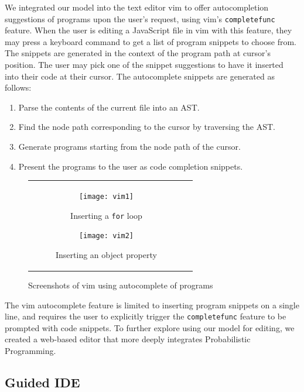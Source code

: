 \documentclass[titlepage]{article}
\begin{document}
We integrated our model into the text editor vim to offer autocompletion
suggestions of programs upon the user's request, using vim's
\texttt{completefunc} feature. When the user is editing a JavaScript file in vim with
this feature, they may press a keyboard command to get a list of program
snippets to choose from. The snippets are generated in the context of the
program path at cursor's position. The user may pick one of the snippet
suggestions to have it inserted into their code at their cursor. The autocomplete snippets are generated as follows:
\begin{enumerate}
	\item Parse the contents of the current file into an AST.
	\item Find the node path corresponding to the cursor by traversing the AST.
	\item Generate programs starting from the node path of the cursor.
	\item Present the programs to the user as code completion snippets.
\end{enumerate}

\begin{figure}[ht]
	\centering
	\begin{tabular}{c c}
		\begin{subfigure}[h]{6.25cm}
			\centering
			\texttt{[image: vim1]}
			\caption{Inserting a {\tt for} loop} \label{fig:vim1}
		\end{subfigure}
		\begin{subfigure}[h]{6cm}
			\centering
			\texttt{[image: vim2]}
			\caption{Inserting an object property} \label{fig:vim2}
		\end{subfigure}
	\end{tabular}
	\caption{Screenshots of vim using autocomplete of programs}
\end{figure}

The vim autocomplete feature is limited to inserting program snippets on a single
line, and requires the user to explicitly trigger the \texttt{completefunc}
feature to be prompted with code snippets. To further explore using our model
for editing, we created a web-based editor that more deeply integrates Probabilistic
Programming.

\subsection{Guided IDE}
\end{document}
